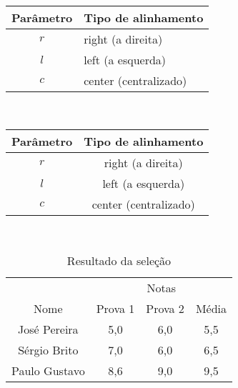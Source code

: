 \documentclass[12pt,a4paper]{article}
\begin{document}
\begin{tabular}{c | l}
    Parâmetro & Tipo de alinhamento   \\ \hline
    $r$       & right (a direita)     \\
    $l$       & left (a esquerda)     \\
    $c$       & center (centralizado) \\ \hline
\end{tabular} \\ \vspace{0.5cm}

\begin{tabular}{|c|c|}
    \hline
    Parâmetro & Tipo de alinhamento   \\ \hline
    $r$       & right (a direita)     \\
    $l$       & left (a esquerda)     \\
    $c$       & center (centralizado) \\ \hline
\end{tabular} \\ \vspace{0.5cm}

\begin{table}[h]
    \centering
    \begin{tabular}{| c | c | c | c |}
        \hline
                      & \multicolumn{3}{c|}{Notas}                   \\
        \cline{2-4}    %
        Nome          & Prova 1                    & Prova 2 & Média \\
        \hline
        José Pereira  & 5,0                        & 6,0     & 5,5   \\
        Sérgio Brito  & 7,0                        & 6,0     & 6,5   \\
        Paulo Gustavo & 8,6                        & 9,0     & 9,5   \\
        \hline
    \end{tabular}
    \caption{Resultado da seleção}
    \label{tab:my_label}
\end{table}
\end{document}
